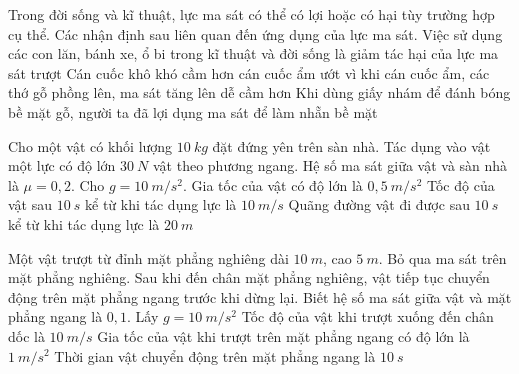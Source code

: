\begin{ex}%
Trong đời sống và kĩ thuật, lực ma sát có thể có lợi hoặc có hại tùy trường hợp cụ thể. Các nhận định sau liên quan đến ứng dụng của lực ma sát.
{\True Việc sử dụng các con lăn, bánh xe, ổ bi trong kĩ thuật và đời sống là giảm tác hại của lực ma sát trượt}
{Cán cuốc khô khó cầm hơn cán cuốc ẩm ướt vì khi cán cuốc ẩm, các thớ gỗ phồng lên, ma sát tăng lên dễ cầm hơn}
{\True Khi dùng giấy nhám để đánh bóng bề mặt gỗ, người ta đã lợi dụng ma sát để làm nhẵn bề mặt}
\loigiai{
\begin{itemchoice}
\itemch
\itemch
\itemch
\itemch	
\end{itemchoice}
}
 \end{ex}
\begin{ex}%
Cho một vật có khối lượng $10\ kg$ đặt đứng yên trên sàn nhà. Tác dụng vào vật một lực có độ lớn $30\ N$ vật theo phương ngang. Hệ số ma sát giữa vật và sàn nhà là $\mu=0,2$. Cho $g=10 \ m/s^2$.
{Gia tốc của vật có độ lớn là $0,5 \ m/s^2$} 
{\True Tốc độ của vật sau $10\ s$ kể từ khi tác dụng lực là $10 \ m/s$} 
{Quãng đường vật đi được sau $10\ s$ kể từ khi tác dụng lực là $20\ m$} 
\loigiai{ 
\begin{itemchoice}
\itemch
\itemch
\itemch
\itemch
\end{itemchoice}
}
\end{ex}
\begin{ex}%
Một vật trượt từ đỉnh mặt phẳng nghiêng dài $10\ m$, cao $5\ m$. Bỏ qua ma sát trên mặt phẳng nghiêng. Sau khi đến chân mặt phẳng nghiêng, vật tiếp tục chuyển động trên mặt phẳng ngang trước khi dừng lại. Biết hệ số ma sát giữa vật và mặt phẳng ngang là $0,1$. Lấy $g=10 \ m/s^2$
{\True Tốc độ của vật khi trượt xuống đến chân dốc là $10 \ m/s$} 
{\True Gia tốc của vật khi trượt trên mặt phẳng ngang có độ lớn là $1 \ m/s^2$} 
{\True Thời gian vật chuyển động trên mặt phẳng ngang là $10\ s$} 
\loigiai{ 
\begin{itemchoice}
\itemch
\itemch
\itemch
\itemch
\end{itemchoice}
}
\end{ex}























